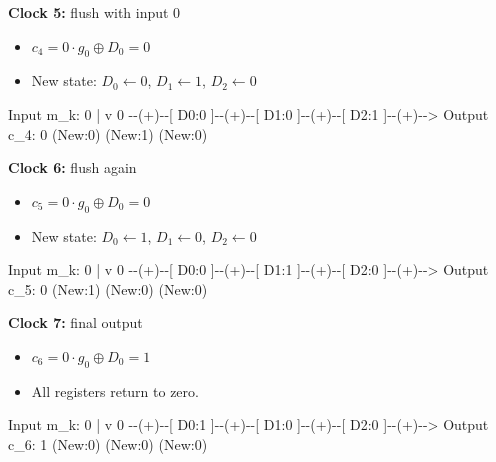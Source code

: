 \documentclass[11pt,oneside]{book}
\newenvironment{Shaded}{}{}
\newcommand{\NormalTok}[1]{#1}
\providecommand{\tightlist}{\setlength{\itemsep}{0pt}\setlength{\parskip}{0pt}}
\theoremstyle{plain}
\theoremstyle{definition}
\theoremstyle{remark}
\begin{document}
\textbf{Clock 5:} flush with input 0

\begin{itemize}
\tightlist
\item
  \(c_4 = 0 \cdot g_0 \oplus D_0 = 0\)
\item
  New state: \(D_0 \leftarrow 0\), \(D_1 \leftarrow 1\),
  \(D_2 \leftarrow 0\)
\end{itemize}

\begin{Shaded}
\begin{Highlighting}[]
\NormalTok{Input m\_k: 0}
\NormalTok{     |}
\NormalTok{     v}
\NormalTok{0 {-}{-}(+){-}{-}[ D0:0 ]{-}{-}(+){-}{-}[ D1:0 ]{-}{-}(+){-}{-}[ D2:1 ]{-}{-}(+){-}{-}\textgreater{} Output c\_4: 0}
\NormalTok{         (New:0)        (New:1)        (New:0)}
\end{Highlighting}
\end{Shaded}

\textbf{Clock 6:} flush again

\begin{itemize}
\tightlist
\item
  \(c_5 = 0 \cdot g_0 \oplus D_0 = 0\)
\item
  New state: \(D_0 \leftarrow 1\), \(D_1 \leftarrow 0\),
  \(D_2 \leftarrow 0\)
\end{itemize}

\begin{Shaded}
\begin{Highlighting}[]
\NormalTok{Input m\_k: 0}
\NormalTok{     |}
\NormalTok{     v}
\NormalTok{0 {-}{-}(+){-}{-}[ D0:0 ]{-}{-}(+){-}{-}[ D1:1 ]{-}{-}(+){-}{-}[ D2:0 ]{-}{-}(+){-}{-}\textgreater{} Output c\_5: 0}
\NormalTok{         (New:1)        (New:0)        (New:0)}
\end{Highlighting}
\end{Shaded}

\textbf{Clock 7:} final output

\begin{itemize}
\tightlist
\item
  \(c_6 = 0 \cdot g_0 \oplus D_0 = 1\)
\item
  All registers return to zero.
\end{itemize}

\begin{Shaded}
\begin{Highlighting}[]
\NormalTok{Input m\_k: 0}
\NormalTok{     |}
\NormalTok{     v}
\NormalTok{0 {-}{-}(+){-}{-}[ D0:1 ]{-}{-}(+){-}{-}[ D1:0 ]{-}{-}(+){-}{-}[ D2:0 ]{-}{-}(+){-}{-}\textgreater{} Output c\_6: 1}
\NormalTok{         (New:0)        (New:0)        (New:0)}
\end{Highlighting}
\end{Shaded}
\end{document}
